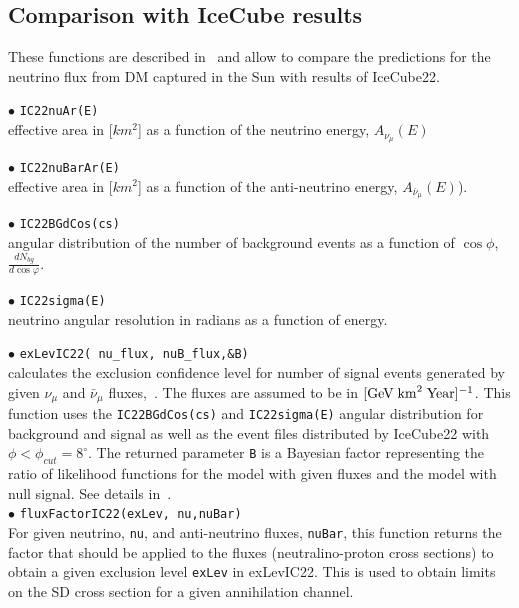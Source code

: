 \documentclass[12pt,a4paper]{article}
\begin{document}
\subsection{Comparison with IceCube results}


These functions are described in~\cite{Belanger:2015hra} and allow to compare the predictions for the neutrino flux from DM captured in the Sun with results of IceCube22.

\noindent
$\bullet$ \verb|IC22nuAr(E)|\\
effective area in [$km^2$] as a function of the neutrino energy, $A_{\nu_{\mu}}(E)$ 

\noindent$\bullet$ \verb|IC22nuBarAr(E)|\\
effective area in [$km^2$] as a function of the anti-neutrino energy, $A_{\bar{\nu}_{\mu}}(E)$).


\noindent
$\bullet$ \verb|IC22BGdCos(cs)| \\
angular distribution of the number of background events as a function of $\cos\phi$, $\frac{dN_{bg}}{d\cos{\varphi}}$.
  
 \noindent 
$\bullet$ \verb|IC22sigma(E)|\\
neutrino angular resolution in radians  as a function of energy. 

\noindent
$\bullet$ \verb|exLevIC22( nu_flux, nuB_flux,&B)|\\
 calculates the  exclusion confidence  level  for number of signal events 
generated by  given $\nu_{\mu}$ and  
$\bar{\nu}_{\mu}$  fluxes,~\cite{Belanger:2015hra}. The fluxes are assumed to be in
$[\rm{GeV\;km}^2\;\rm{Year}]^{-1}$.  This function uses
the \verb|IC22BGdCos(cs)| and \verb|IC22sigma(E)| angular distribution for background and 
signal as well as the event files distributed  by IceCube22 
with  $\phi<\phi_{cut}=8^{\circ} $.  The returned parameter \verb|B| is a
Bayesian  factor representing the ratio of likelihood functions for the  model
with  given fluxes and the model  with null signal.  See details in~\cite{Belanger:2015hra}.\\
\noindent  
$\bullet$ \verb|fluxFactorIC22(exLev, nu,nuBar)|\\
For given neutrino, \verb|nu|, and anti-neutrino fluxes, \verb|nuBar|, 
this function returns the factor that should be applied to the 
fluxes (neutralino-proton   cross sections)  to obtain a given exclusion
level {\tt exLev}  in exLevIC22. This is used to obtain  limits on the SD cross 
section for a given annihilation channel.
\end{document}
